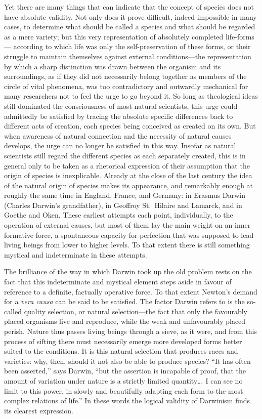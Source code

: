 \documentclass[12pt,a4paper]{article}
\begin{document}
Yet there are many things that can indicate that the concept of
species does not have absolute validity. Not only does it prove
difficult, indeed impossible in many cases, to determine what should
be called a species and what should be regarded as a mere variety;
but this very representation of absolutely completed life-forms---
according to which life was only the self-preservation of these
forms, or their struggle to maintain themselves against external
conditions---the representation by which a sharp distinction was
drawn between the organism and its surroundings, as if they did not
necessarily belong together as members of the circle of vital
phenomena, was too contradictory and outwardly mechanical for many
researchers not to feel the urge to go beyond it. So long as
theological ideas still dominated the consciousness of most natural
scientists, this urge could admittedly be satisfied by tracing the
absolute specific differences back to different acts of creation,
each species being conceived as created on its own. But when
awareness of natural connection and the necessity of natural causes
develops, the urge can no longer be satisfied in this way. Insofar as
natural scientists still regard the different species as each
separately created, this is in general only to be taken as a
rhetorical expression of their assumption that the origin of species
is inexplicable. Already at the close of the last century the idea of
the natural origin of species makes its appearance, and remarkably
enough at roughly the same time in England, France, and Germany: in
Erasmus Darwin (Charles Darwin's grandfather), in Geoffroy St.\
Hilaire and Lamarck, and in Goethe and Oken. These earliest attempts
each point, individually, to the operation of external causes, but
most of them lay the main weight on an inner formative force, a
spontaneous capacity for perfection that was supposed to lead living
beings from lower to higher levels. To that extent there is still
something mystical and indeterminate in these attempts.

The brilliance of the way in which Darwin took up the old problem
rests on the fact that this indeterminate and mystical element steps
aside in favour of reference to a definite, factually operative force.
To that extent Newton's demand for a \textit{vera causa} can be said
to be satisfied. The factor Darwin refers to is the so-called quality
selection, or natural selection---the fact that only the favourably
placed organisms live and reproduce, while the weak and unfavourably
placed perish. Nature thus passes living beings through a sieve, as it
were, and from this process of sifting there must necessarily emerge
more developed forms better suited to the conditions. It is this
natural selection that produces races and varieties: why, then, should
it not also be able to produce species? ``It has often been
asserted,'' says Darwin, ``but the assertion is incapable of proof,
that the amount of variation under nature is a strictly limited
quantity\ldots\ I can see no limit to this power, in slowly and
beautifully adapting each form to the most complex relations of life.''
In these words the logical validity of Darwinism finds its clearest
expression.
\end{document}

